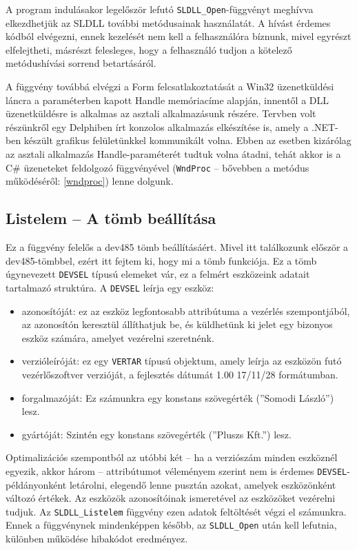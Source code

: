 \documentclass[tocnopagenum]{thesis-ekf}
\begin{document}
	A program indulásakor legelőször lefutó \verb*|SLDLL_Open|-függvényt meghívva elkezdhetjük az SLDLL további metódusainak használatát. A hívást érdemes kódból elvégezni, ennek kezelését nem kell a felhasználóra bíznunk, mivel egyrészt elfelejtheti, másrészt felesleges, hogy a felhasználó tudjon a kötelező metódushívási sorrend betartásáról. 
	
	A függvény továbbá elvégzi a Form felcsatlakoztatását a Win32 üzenetküldési láncra a paraméterben kapott Handle memóriacíme alapján, innentől a DLL üzenetküldésre is alkalmas az asztali alkalmazásunk részére. Tervben volt részünkről egy Delphiben írt konzolos alkalmazás elkészítése is, amely a .NET-ben készült grafikus felületünkkel kommunikált volna. Ebben az esetben kizárólag az asztali alkalmazás Handle-paraméterét tudtuk volna átadni, tehát akkor is a C\# üzeneteket feldolgozó függvényével (\verb*|WndProc| -- bővebben a metódus működéséről: \ref{wndproc}) lenne dolgunk.
	
	\subsection{Listelem -- A tömb beállítása}
	Ez a függvény felelős a dev485 tömb beállításáért. Mivel itt találkozunk először a dev485-tömbbel, ezért itt fejtem ki, hogy mi a tömb funkciója. Ez a tömb úgynevezett \verb*|DEVSEL| típusú elemeket vár, ez a felmért eszközeink adatait tartalmazó struktúra. A \verb*|DEVSEL| leírja egy eszköz: \begin{itemize}
		\item azonosítóját: ez az eszköz legfontosabb attribútuma a vezérlés szempontjából, az azonosítón keresztül állíthatjuk be, és küldhetünk ki jelet egy bizonyos eszköz számára, amelyet vezérelni szeretnénk.
		\item verzióleíróját: ez egy \verb*|VERTAR| típusú objektum, amely leírja az eszközön futó vezérlőszoftver verzióját, a fejlesztés dátumát 1.00 17/11/28 formátumban.
		\item forgalmazóját: Ez számunkra egy konstans szövegérték (''Somodi László'') lesz.
		\item gyártóját: Szintén egy konstans szövegérték (''Pluszs Kft.'') lesz.
	\end{itemize}
	Optimalizációs szempontból az utóbbi két  -- ha a verziószám minden eszköznél egyezik, akkor három -- attribútumot véleményem szerint nem is érdemes \verb*|DEVSEL|-példányonként letárolni, elegendő lenne pusztán azokat, amelyek eszközönként változó értékek. Az eszközök azonosítóinak ismeretével az eszközöket vezérelni tudjuk. Az \verb*|SLDLL_Listelem| függvény ezen adatok feltöltését végzi el számunkra.	Ennek a függvénynek mindenképpen később, az \verb*|SLDLL_Open| után kell lefutnia, különben működése hibakódot eredményez.
\end{document}
